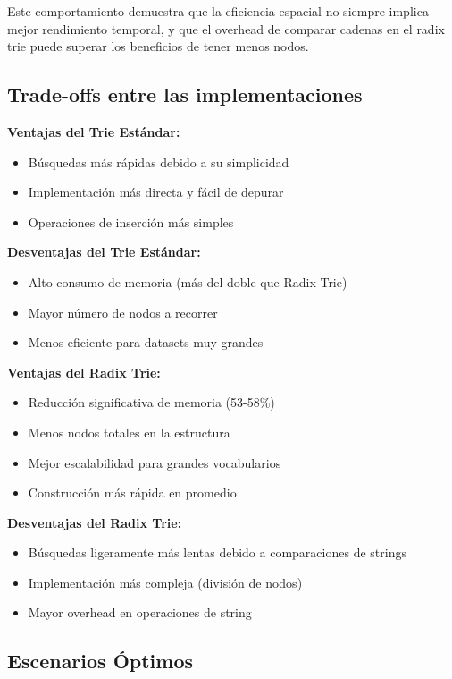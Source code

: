 \documentclass[11pt,a4paper]{article}
\begin{document}
Este comportamiento demuestra que la eficiencia espacial no siempre implica mejor rendimiento temporal, y que el overhead de comparar cadenas en el radix trie puede superar los beneficios de tener menos nodos.

\subsection{Trade-offs entre las implementaciones}

\textbf{Ventajas del Trie Estándar:}
\begin{itemize}
    \item Búsquedas más rápidas debido a su simplicidad
    \item Implementación más directa y fácil de depurar
    \item Operaciones de inserción más simples
\end{itemize}

\textbf{Desventajas del Trie Estándar:}
\begin{itemize}
    \item Alto consumo de memoria (más del doble que Radix Trie)
    \item Mayor número de nodos a recorrer
    \item Menos eficiente para datasets muy grandes
\end{itemize}

\textbf{Ventajas del Radix Trie:}
\begin{itemize}
    \item Reducción significativa de memoria (53-58\%)
    \item Menos nodos totales en la estructura
    \item Mejor escalabilidad para grandes vocabularios
    \item Construcción más rápida en promedio
\end{itemize}

\textbf{Desventajas del Radix Trie:}
\begin{itemize}
    \item Búsquedas ligeramente más lentas debido a comparaciones de strings
    \item Implementación más compleja (división de nodos)
    \item Mayor overhead en operaciones de string
\end{itemize}

\subsection{Escenarios Óptimos}
\end{document}
